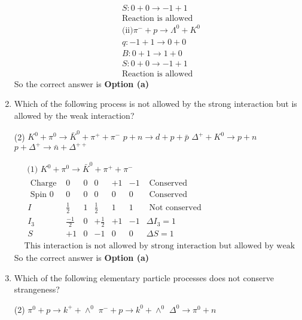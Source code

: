 \begin{enumerate}
\begin{answer}
\begin{align*}
		&S: 0+0 \rightarrow-1+1\\
		&\text{Reaction is allowed}\\
		&\text{(ii)} \pi^{-}+p \rightarrow \Lambda^0+K^0\\
		&q:-1+1 \rightarrow 0+0\\
		&B: 0+1 \rightarrow 1+0\\
		&S: 0+0 \rightarrow-1+1\\
		&\text{Reaction is allowed}
		\end{align*}
		So the correct answer is \textbf{Option (a)}
	\end{answer}
	\item  Which of the following process is not allowed by the strong interaction but is allowed by the weak interaction?
	{}
	\begin{tasks}(2)
		\task[\textbf{a.}]$K^0+\pi^0 \rightarrow \bar{K}^0+\pi^{+}+\pi^{-}$
		\task[\textbf{b.}]$p+n \rightarrow d+p+\bar{p}$
		\task[\textbf{c.}]$\Delta^{+}+K^0 \rightarrow p+n$
		\task[\textbf{d.}] $p+\Delta^{+} \rightarrow \bar{n}+\Delta^{++}$
	\end{tasks}
	\begin{answer}
		\begin{align*}
		&\text { (1) } K^0+\pi^0 \rightarrow \bar{K}^0+\pi^{+}+\pi^{-}\\
		&\begin{array}{lllllll}
		\text { Charge }& 0 & 0 & 0 & +1 & -1 & \text { Conserved }\\
		\text { Spin }0 & 0 & 0 & 0 & 0 &0& \text { Conserved }\\
		I & \frac{1}{2} & 1 & \frac{1}{2} & 1 & 1&\text { Not conserved }\\
		I_3 & \frac{-1}{2} & 0 & +\frac{1}{2} & +1 & -1 & \Delta I_3=1 \\
		S & +1 & 0 & -1 & 0 & 0 & \Delta S=1
		\end{array}\\
		&\text{This interaction is not allowed by strong interaction but allowed by weak interaction}
		\end{align*}
		So the correct answer is \textbf{Option (a)}
	\end{answer}
	\item  Which of the following elementary particle processes does not conserve strangeness?
	{}
	\begin{tasks}(2)
		\task[\textbf{a.}]$\pi^0+p \rightarrow k^{+}+\wedge^0$
		\task[\textbf{b.}]$\pi^{-}+p \rightarrow k^0+\wedge^0$
		\task[\textbf{c.}]$\Delta^0 \rightarrow \pi^0+n$

\end{tasks}
\end{enumerate}
